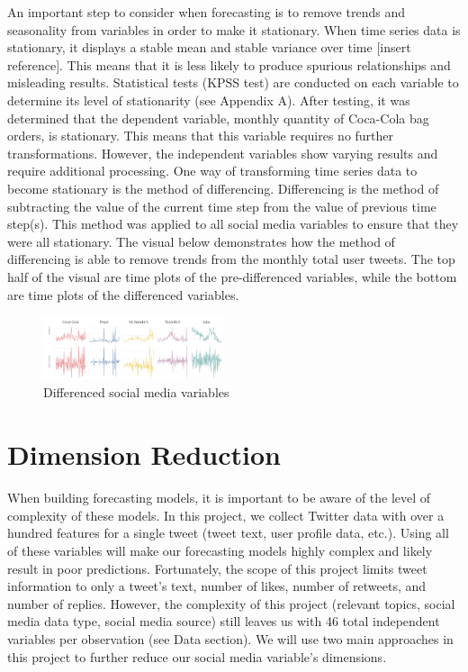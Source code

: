\documentclass[12pt,oneside]{chicagocapstone}
\begin{document}
An important step to consider when forecasting is to remove trends and seasonality from variables in order to make it stationary. When time series data is stationary, it displays a stable mean and stable variance over time {[}insert reference{]}. This means that it is less likely to produce spurious relationships and misleading results. Statistical tests (KPSS test) are conducted on each variable to determine its level of stationarity (see Appendix A). After testing, it was determined that the dependent variable, monthly quantity of Coca-Cola bag orders, is stationary. This means that this variable requires no further transformations. However, the independent variables show varying results and require additional processing. One way of transforming time series data to become stationary is the method of differencing. Differencing is the method of subtracting the value of the current time step from the value of previous time step(s). This method was applied to all social media variables to ensure that they were all stationary. The visual below demonstrates how the method of differencing is able to remove trends from the monthly total user tweets. The top half of the visual are time plots of the pre-differenced variables, while the bottom are time plots of the differenced variables.
\begin{figure}

{\centering \includegraphics[width=200px,angle = 0, scale=2.1]{figure/differencing} 

}

\caption{Differenced social media variables}\label{fig:differencing}
\end{figure}
\hypertarget{dimension-reduction}{%
\section*{Dimension Reduction}\label{dimension-reduction}}

When building forecasting models, it is important to be aware of the level of complexity of these models. In this project, we collect Twitter data with over a hundred features for a single tweet (tweet text, user profile data, etc.). Using all of these variables will make our forecasting models highly complex and likely result in poor predictions. Fortunately, the scope of this project limits tweet information to only a tweet's text, number of likes, number of retweets, and number of replies. However, the complexity of this project (relevant topics, social media data type, social media source) still leaves us with 46 total independent variables per observation (see Data section). We will use two main approaches in this project to further reduce our social media variable's dimensions.
\end{document}
